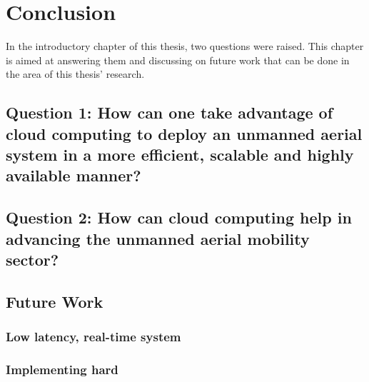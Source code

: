 
\chapter{Conclusion}
\label{chap:conclusion}

In the introductory chapter of this thesis, two questions were raised. This chapter is aimed at answering them and discussing on future work that can be done in the area of this thesis' research.

\section{Question 1: How can one take advantage of cloud computing to deploy an unmanned aerial system in a more efficient, scalable and highly available manner?}

\section{Question 2: How can cloud computing help in advancing the unmanned aerial mobility sector?}


\section{Future Work}

\subsection{Low latency, real-time system}

\subsection{Implementing hard}

